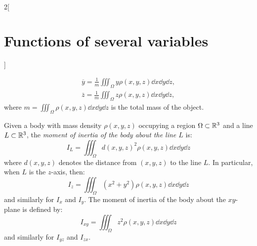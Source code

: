 \documentclass[../../../main.tex]{subfiles}
\begin{document}
\begin{multicols}{2}[\section{Functions of several variables}]
\begin{definition}
\begin{gather*}
            \overline{y}=\frac{1}{m}\iiint_\Omega y\rho(x,y,z)\dd x\dd y\dd z,\\
            \overline{z}=\frac{1}{m}\iiint_\Omega z\rho(x,y,z)\dd x\dd y\dd z,
        \end{gather*}
        where $\displaystyle m=\iiint_\Omega\rho(x,y,z)\dd x\dd y\dd z$ is the total mass of the object.
    \end{definition}
    \begin{definition}
        Given a body with mass density $\rho(x,y,z)$ occupying a region $\Omega\subset\mathbb{R}^3$ and a line $L\subset\mathbb{R}^3$, the \textit{moment of inertia of the body about the line $L$} is: $$I_L=\iiint_\Omega d(x,y,z)^2\rho(x,y,z)\dd x\dd y\dd z$$ where $d(x,y,z)$ denotes the distance from $(x,y,z)$ to the line $L$. In particular, when $L$ is the $z$-axis, then: $$I_z=\iiint_\Omega (x^2+y^2)\rho(x,y,z)\dd x\dd y\dd z$$ and similarly for $I_x$ and $I_y$. The moment of inertia of the body about the $xy$-plane is defined by: $$I_{xy}=\iiint_\Omega z^2\rho(x,y,z)\dd x\dd y\dd z$$ and similarly for $I_{yz}$ and $I_{zx}.$
    \end{definition}

\end{multicols}
\end{document}
